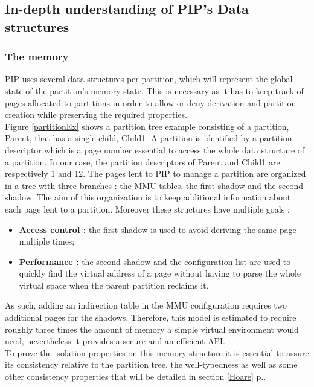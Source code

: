 
\subsection{In-depth understanding of PIP's Data structures} \label{structures}

\subsubsection{The memory}

PIP uses several data structures per partition, which will represent the global state of the partition's memory state. This is necessary as it has to keep track of pages allocated to partitions in order to allow or deny derivation and partition creation while preserving the required properties. \\

Figure \ref{partitionEx} shows a partition tree example consisting of a  partition, Parent, that has a single child, Child1. A partition is identified by a partition descriptor which is a page number essential to access the whole data structure of a partition. In our case, the partition descriptors of Parent and Child1 are respectively 1 and 12. The pages lent to PIP to manage a partition are organized in a tree with three branches : the MMU tables, the first shadow and the second shadow. The aim of this organization is to keep additional information about each page lent to a partition. Moreover these structures have multiple goals :
\begin{itemize}
	\item \textbf{Access control :} the first shadow is used to avoid deriving the same page multiple times;
	\item \textbf{Performance :} the second shadow and the configuration list are used to quickly find the virtual address of a page without having to parse the whole virtual space when the parent partition reclaims it.
\end{itemize} 
As such, adding an indirection table in the MMU configuration requires two additional pages for the shadows. Therefore, this model is estimated to require roughly three times the amount of memory a simple virtual environment would need, nevertheless it provides a  secure and an efficient API. \\

To prove the isolation properties on this memory structure it is essential to assure its consistency relative to the partition tree, the well-typedness as well as some other consistency properties that will be detailed in section \ref{Hoare} p.\pageref{Hoare}.

